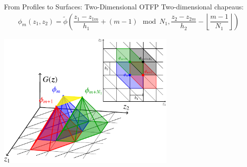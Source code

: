 \begin{frame}{From Profiles to Surfaces: Two-Dimensional OTFP}
Two-dimensional chapeaus:
\begin{align*}
\phi_m(z_1,z_2)=
\tilde\phi\left(\dfrac{z_1-z_{1m}}{h_1}+(m-1)\!\!\!\mod N_1,\dfrac{z_2-z_{2m}}{h_2}-\left\lfloor \dfrac{m-1}{N_1}\right\rfloor \right)
\end{align*}
\begin{center}
\includegraphics[width=0.65\textwidth]{plane.pdf}
\end{center}
\end{frame}

